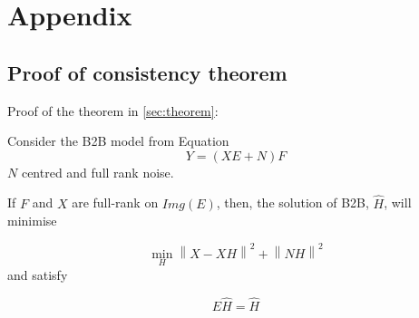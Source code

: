 \newpage
\appendix
\section{Appendix}

\subsection{Proof of consistency theorem}
\label{appendix:theorem_proof}

Proof of the theorem in \ref{sec:theorem}:


\begin{theorem}

     Consider the B2B model from Equation $$Y = (XE + N)F$$ $N$ centred and full rank noise.

     If $F$ and $X$ are full-rank on $Img(E)$, then, the solution of B2B, $\hat H$, will minimise

     $$\min_H  \left \| X - XH\right\| ^2  + \left \| NH\right \| ^2$$ and satisfy

     $$E\hat H = \hat H$$
\end{theorem}
